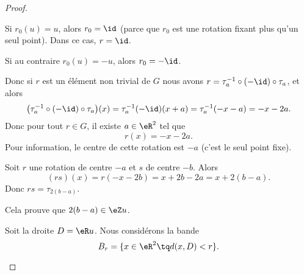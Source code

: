 \begin{proof}
\begin{subproof}
\begin{subproof}
			Si \( r_0(u)=u\), alors \( r_0=\id\) (parce que \( r_0\) est une rotation fixant plus qu'un seul point). Dans ce cas, \( r=\id\).

			Si au contraire \( r_0(u)=-u\), alors \( r_0=-\id\).

			Donc si \( r\) est un élément non trivial de \( G\) nous avons \( r=\tau_a^{-1}\circ(-\id)\circ\tau_a\), et alors
			\begin{equation}
				\big( \tau_a^{-1}\circ(-\id)\circ\tau_a \big)(x)=\tau_a^{-1}  (-\id)(x+a)=\tau_a^{-1}(-x-a)=-x-2a.
			\end{equation}
			Donc pour tout \( r\in G\), il existe \( a\in \eR^2\) tel que
			\begin{equation}        \label{EQooQGNVooKyCCYW}
				r(x)=-x-2a.
			\end{equation}
			Pour information, le centre de cette rotation est \( -a\) (c'est le seul point fixe).

			Soit \( r\) une rotation de centre \( -a\) et \( s\) de centre \( -b\). Alors
			\begin{equation}
				(rs)(x)=r(-x-2b)=x+2b-2a=x+2(b-a).
			\end{equation}
			Donc \( rs=\tau_{2(b-a)}\).

			Cela prouve que \(2(b-a)\in \eZ u\).

			Soit la droite \( D=\eR u\). Nous considérons la bande
			\begin{equation}
				B_r=\{ x\in \eR^2\tq d(x,D)<r \}.
			\end{equation}


\end{subproof}
\end{subproof}
\end{proof}
